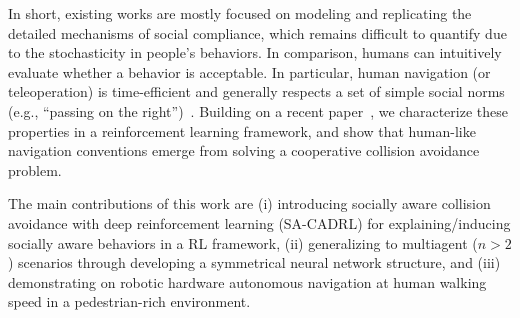 In short, existing works are mostly focused on modeling and replicating the detailed mechanisms of social compliance, which remains difficult to quantify due to the stochasticity in people's behaviors. In comparison, humans can intuitively evaluate whether a behavior is acceptable. In particular, human navigation (or teleoperation) is time-efficient and generally respects a set of simple social norms (e.g., ``passing on the right'')~\cite{kim_socially_2015,kretzschmar_socially_2016,knepper_pedestrian-inspired_2012}. %
Building on a recent paper~\cite{chen_decentralized_2017}, we characterize these properties in a reinforcement learning framework, and show that human-like navigation conventions emerge from solving a cooperative collision avoidance problem.

The main contributions of this work are 
(i) introducing socially aware collision avoidance with deep reinforcement learning (SA-CADRL) for explaining/inducing socially aware behaviors in a RL framework, (ii) generalizing to multiagent ($n>2$) scenarios through developing a symmetrical neural network structure, and (iii) demonstrating on robotic hardware autonomous navigation at human walking speed in a pedestrian-rich environment. 












